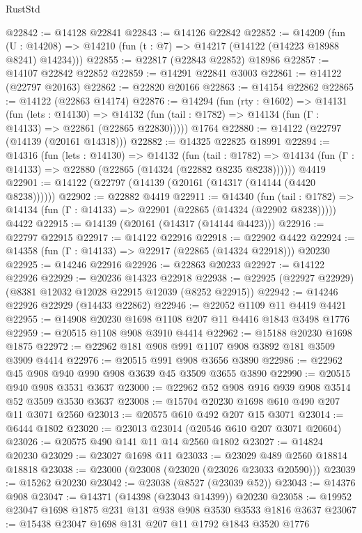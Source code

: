 \begin{lexlean}{RustStd}
\begin{coremodule}
@22842 := @14128 @22841
@22843 := @14126 @22842
@22852 := @14209
    (fun (U : @14208) => @14210 (fun (t : @7) => @14217 (@14122 (@14223 @18988 @8241) @14234)))
@22855 := @22817 (@22843 @22852) @18986
@22857 := @14107 @22842 @22852
@22859 := @14291 @22841 @3003
@22861 := @14122 (@22797 @20163)
@22862 := @22820 @20166
@22863 := @14154 @22862
@22865 := @14122 (@22863 @14174)
@22876 := @14294
    (fun (rty : @1602) =>
    @14131
      (fun (lets : @14130) =>
      @14132 (fun (tail : @1782) => @14134 (fun (Γ : @14133) => @22861 (@22865 @22830)))))
    @1764
@22880 := @14122 (@22797 (@14139 (@20161 @14318)))
@22882 := @14325 @22825 @18991
@22894 := @14316
    (fun (lets : @14130) =>
    @14132
      (fun (tail : @1782) =>
      @14134 (fun (Γ : @14133) => @22880 (@22865 (@14324 (@22882 @8235 @8238))))))
    @4419
@22901 := @14122 (@22797 (@14139 (@20161 (@14317 (@14144 (@4420 @8238))))))
@22902 := @22882 @4419
@22911 := @14340
    (fun (tail : @1782) => @14134 (fun (Γ : @14133) => @22901 (@22865 (@14324 (@22902 @8238)))))
    @4422
@22915 := @14139 (@20161 (@14317 (@14144 @4423)))
@22916 := @22797 @22915
@22917 := @14122 @22916
@22918 := @22902 @4422
@22924 := @14358 (fun (Γ : @14133) => @22917 (@22865 (@14324 @22918))) @20230
@22925 := @14246 @22916
@22926 := @22863 @20233
@22927 := @14122 @22926
@22929 := @20236 @14323 @22918
@22938 := @22925 (@22927 @22929) (@8381 @12032 @12028 @22915 @12039 (@8252 @22915))
@22942 := @14246 @22926 @22929 (@14433 @22862)
@22946 := @22052 @1109 @11 @4419 @4421
@22955 := @14908 @20230 @1698 @1108 @207 @11 @4416 @1843 @3498 @1776
@22959 := @20515 @1108 @908 @3910 @4414
@22962 := @15188 @20230 @1698 @1875
@22972 := @22962 @181 @908 @991 @1107 @908 @3892 @181 @3509 @3909 @4414
@22976 := @20515 @991 @908 @3656 @3890
@22986 := @22962 @45 @908 @940 @990 @908 @3639 @45 @3509 @3655 @3890
@22990 := @20515 @940 @908 @3531 @3637
@23000 := @22962 @52 @908 @916 @939 @908 @3514 @52 @3509 @3530 @3637
@23008 := @15704 @20230 @1698 @610 @490 @207 @11 @3071 @2560
@23013 := @20575 @610 @492 @207 @15 @3071
@23014 := @6444 @1802
@23020 := @23013 @23014 (@20546 @610 @207 @3071 @20604)
@23026 := @20575 @490 @141 @11 @14 @2560 @1802
@23027 := @14824 @20230
@23029 := @23027 @1698 @11
@23033 := @23029 @489 @2560 @18814 @18818
@23038 := @23000 (@23008 (@23020 (@23026 @23033 @20590)))
@23039 := @15262 @20230
@23042 := @23038 (@8527 (@23039 @52))
@23043 := @14376 @908
@23047 := @14371 (@14398 (@23043 @14399)) @20230
@23058 := @19952 @23047 @1698 @1875 @231 @131 @938 @908 @3530 @3533 @1816 @3637
@23067 := @15438 @23047 @1698 @131 @207 @11 @1792 @1843 @3520 @1776

\end{coremodule}
\end{lexlean}
